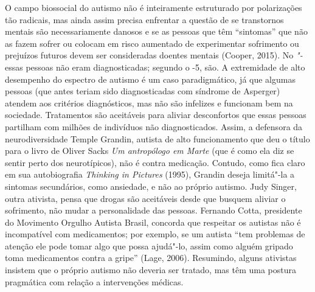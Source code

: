 O campo biossocial do autismo não é inteiramente estruturado por
polarizações tão radicais, mas ainda assim precisa enfrentar a questão
de se transtornos mentais são necessariamente danosos e se as pessoas
que têm ``sintomas'' que não as fazem sofrer ou colocam em risco
aumentado de experimentar sofrimento ou prejuízos futuros devem ser
consideradas doentes mentais (Cooper, 2015). No \emph{"-} essas
pessoas não eram diagnosticadas; segundo o \emph{}-5, são. A
extremidade de alto desempenho do espectro de autismo é um caso
paradigmático, já que algumas pessoas (que antes teriam sido
diagnosticadas com síndrome de Asperger) atendem aos critérios
diagnósticos, mas não são infelizes e funcionam bem na sociedade.
Tratamentos são aceitáveis para aliviar desconfortos que essas pessoas
partilham com milhões de indivíduos não diagnosticados. Assim, a
defensora da neurodiversidade Temple Grandin, autista de
alto funcionamento que deu o título para o livro de Oliver Sacks
\emph{Um antropólogo em Marte} (que é como ela diz se sentir perto dos
neurotípicos), não é contra medicação. Contudo, como fica claro em sua
autobiografia \emph{Thinking in Pictures} (1995), Grandin deseja
limitá"-la a sintomas secundários, como ansiedade, e não ao próprio
autismo. Judy Singer, outra ativista, pensa que drogas são aceitáveis
desde que busquem aliviar o sofrimento, não mudar a personalidade das
pessoas. Fernando Cotta, presidente do Movimento Orgulho Autista Brasil,
concorda que respeitar os autistas não é incompatível com medicamentos;
por exemplo, se um autista ``tem problemas de atenção ele pode tomar
algo que possa ajudá"-lo, assim como alguém gripado toma medicamentos
contra a gripe'' (Lage, 2006). Resumindo, alguns ativistas insistem
que o próprio autismo não deveria ser tratado, mas têm uma postura
pragmática com relação a intervenções médicas.

